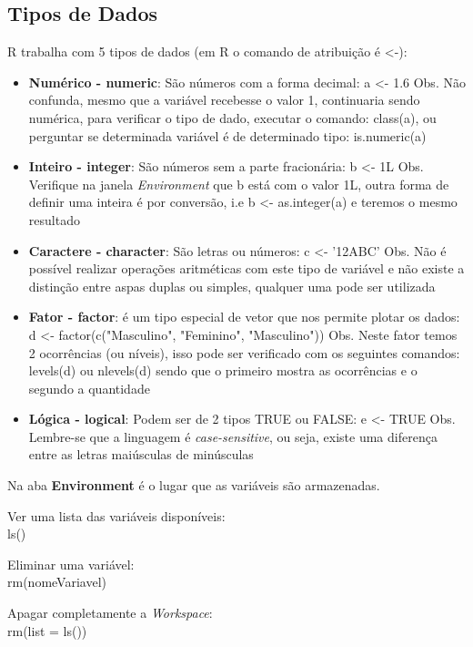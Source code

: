 \documentclass[a4paper,11pt]{article}
\begin{document}
\subsection{Tipos de Dados}
R trabalha com 5 tipos de dados (em R o comando de atribuição é {\ttfamily <-}):
\begin{itemize}
  \item \textbf{Numérico - numeric}: São números com a forma decimal: {\ttfamily a <- 1.6} Obs. Não confunda, mesmo que a variável recebesse o valor 1, continuaria sendo numérica, para verificar o tipo de dado, executar o comando: {\ttfamily class(a)}, ou perguntar se determinada variável é de determinado tipo: {\ttfamily is.numeric(a)} 
  \item \textbf{Inteiro - integer}: São números sem a parte fracionária: {\ttfamily b <- 1L} Obs. Verifique na janela \textit{Environment} que b está com o valor 1L, outra forma de definir uma inteira é por conversão, i.e {\ttfamily b <- as.integer(a)} e teremos o mesmo resultado 
  \item \textbf{Caractere - character}: São letras ou números: {\ttfamily c <- '12ABC'} Obs. Não é possível realizar operações aritméticas com este tipo de variável e não existe a distinção entre aspas duplas ou simples, qualquer uma pode ser utilizada
  \item \textbf{Fator - factor}: é um tipo especial de vetor que nos permite plotar os dados: {\ttfamily d <- factor(c("Masculino", "Feminino", "Masculino"))} Obs. Neste fator temos 2 ocorrências (ou níveis), isso pode ser verificado com os seguintes comandos: {\ttfamily levels(d)} ou {\ttfamily nlevels(d)} sendo que o primeiro mostra as ocorrências e o segundo a quantidade 
  \item \textbf{Lógica - logical}: Podem ser de 2 tipos TRUE ou FALSE: {\ttfamily e <- TRUE} Obs. Lembre-se que a linguagem é \textit{case-sensitive}, ou seja, existe uma diferença entre as letras maiúsculas de minúsculas
\end{itemize}

Na aba \textbf{Environment} é o lugar que as variáveis são armazenadas.

Ver uma lista das variáveis disponíveis: \\
{\ttfamily ls()}

Eliminar uma variável: \\
{\ttfamily rm(nomeVariavel)}

Apagar completamente a \textit{Workspace}: \\
{\ttfamily rm(list = ls())}
\end{document}
